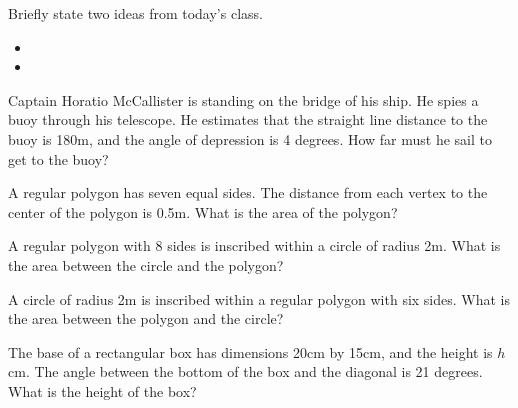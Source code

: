 \begin{problem}
\item Briefly state two ideas from today's class.
  \begin{itemize}
  \item 
  \item 
  \end{itemize}
\item Captain Horatio McCallister is standing on the bridge of his
  ship. He spies a buoy through his telescope. He estimates that the
  straight line distance to the buoy is 180m, and the angle of
  depression is 4 degrees. How far must he sail to get to the buoy?
\item A regular polygon has seven equal sides. The distance from each
  vertex to the center of the polygon is 0.5m. What is the area of the
  polygon?
\item A regular polygon with 8 sides is inscribed within a circle of
  radius 2m. What is the area between the circle and the polygon?
\item A circle of radius 2m is inscribed within a regular polygon with
  six sides. What is the area between the polygon and the circle?
\item The base of a rectangular box has dimensions 20cm by 15cm, and
  the height is $h$ cm. The angle between the bottom of the box and
  the diagonal is 21 degrees. What is the height of the box?
\end{problem}



